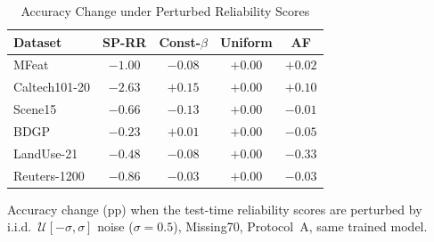 \begin{table}[!t]
\caption{Accuracy Change under Perturbed Reliability Scores}
\label{tab:perturb}
\centering
\footnotesize
\setlength{\tabcolsep}{3pt}
\begin{tabular}{lcccc}
\toprule
Dataset & SP-RR & Const-$\beta$ & Uniform & AF \\
\midrule
MFeat & $-1.00$ & $-0.08$ & $+0.00$ & $+0.02$ \\
Caltech101-20 & $-2.63$ & $+0.15$ & $+0.00$ & $+0.10$ \\
Scene15 & $-0.66$ & $-0.13$ & $+0.00$ & $-0.01$ \\
BDGP & $-0.23$ & $+0.01$ & $+0.00$ & $-0.05$ \\
LandUse-21 & $-0.48$ & $-0.08$ & $+0.00$ & $-0.33$ \\
Reuters-1200 & $-0.86$ & $-0.03$ & $+0.00$ & $-0.03$ \\
\bottomrule
\end{tabular}
\par\smallskip
\parbox{\linewidth}{\scriptsize Accuracy change (pp) when the test-time reliability scores are perturbed by i.i.d.\ $\mathcal U[-\sigma,\sigma]$ noise ($\sigma=0.5$), Missing70, Protocol~A, same trained model.}
\end{table}
